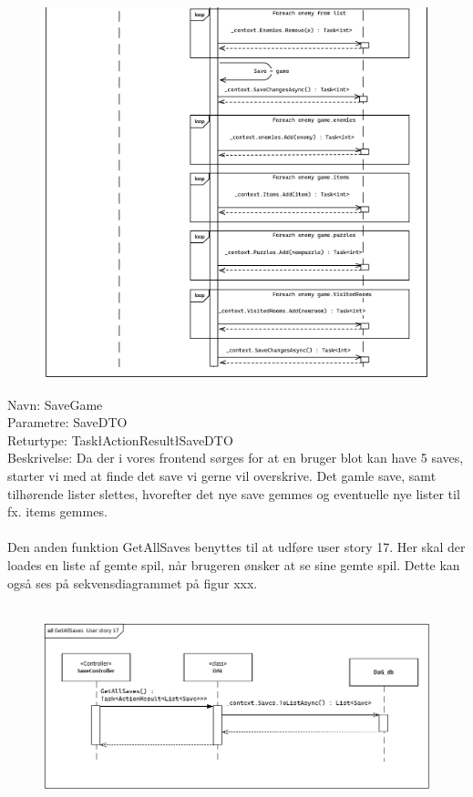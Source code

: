 \begin{figure}[H]
\centering
\includegraphics[width = \textwidth]{02-Body/Images/DAL-Database/SaveSd2.PNG}
\caption{}
\label{fig:DAL-Sekvens-7}
\end{figure}


Navn: SaveGame\\
Parametre: SaveDTO\\
Returtype: Task\l ActionResult\l SaveDTO\g\g \\
Beskrivelse: Da der i vores frontend sørges for at en bruger blot kan have 5 saves, starter vi med at finde det save vi gerne vil overskrive. Det gamle save, samt tilhørende lister slettes, hvorefter det nye save gemmes og eventuelle nye lister til fx. items gemmes.\\\\

Den anden funktion GetAllSaves benyttes til at udføre user story 17.
Her skal der loades en liste af gemte spil, når brugeren ønsker at se sine gemte spil. Dette kan også ses på sekvensdiagrammet på figur xxx.\\\\

\begin{figure}[H]
\centering
\includegraphics[width = \textwidth]{02-Body/Images/DAL-Database/GetSavesSd.PNG}
\caption{}
\label{fig:DAL-Sekvens-17}
\end{figure}

